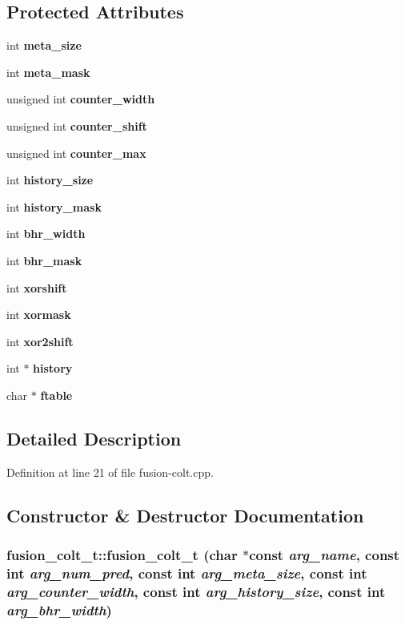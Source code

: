 \subsection*{Protected Attributes}
\begin{CompactItemize}
\item 
int {\bf meta\_\-size}
\item 
int {\bf meta\_\-mask}
\item 
unsigned int {\bf counter\_\-width}
\item 
unsigned int {\bf counter\_\-shift}
\item 
unsigned int {\bf counter\_\-max}
\item 
int {\bf history\_\-size}
\item 
int {\bf history\_\-mask}
\item 
int {\bf bhr\_\-width}
\item 
int {\bf bhr\_\-mask}
\item 
int {\bf xorshift}
\item 
int {\bf xormask}
\item 
int {\bf xor2shift}
\item 
int $\ast$ {\bf history}
\item 
char $\ast$ {\bf ftable}
\end{CompactItemize}


\subsection{Detailed Description}


Definition at line 21 of file fusion-colt.cpp.

\subsection{Constructor \& Destructor Documentation}
\subsubsection[{fusion\_\-colt\_\-t}]{\setlength{\rightskip}{0pt plus 5cm}fusion\_\-colt\_\-t::fusion\_\-colt\_\-t (char $\ast$const  {\em arg\_\-name}, \/  const int {\em arg\_\-num\_\-pred}, \/  const int {\em arg\_\-meta\_\-size}, \/  const int {\em arg\_\-counter\_\-width}, \/  const int {\em arg\_\-history\_\-size}, \/  const int {\em arg\_\-bhr\_\-width})\hspace{0.3cm}{\tt  [inline]}}\label{classfusion__colt__t_62a10d42e1a1fb0acd0acc15b95d0759}




